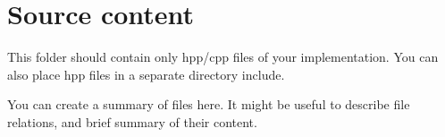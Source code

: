 \chapter{Source content}
\hypertarget{md_src_2readme}{}\label{md_src_2readme}
\label{md_src_2readme_autotoc_md0}%
%
This folder should contain only hpp/cpp files of your implementation. You can also place hpp files in a separate directory {\ttfamily include}.

You can create a summary of files here. It might be useful to describe file relations, and brief summary of their content. 
